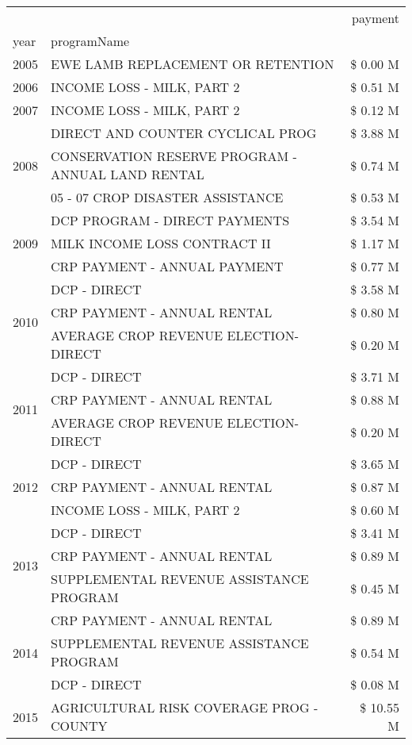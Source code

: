 \begin{tabular}{llr}
\toprule
 &  & payment \\
year & programName &  \\
\midrule
2005 & EWE LAMB REPLACEMENT OR RETENTION & \$ 0.00 M \\
\cline{1-3}
2006 & INCOME LOSS - MILK, PART 2 & \$ 0.51 M \\
\cline{1-3}
2007 & INCOME LOSS - MILK, PART 2 & \$ 0.12 M \\
\cline{1-3}
\multirow[t]{3}{*}{2008} & DIRECT AND COUNTER CYCLICAL PROG & \$ 3.88 M \\
 & CONSERVATION RESERVE PROGRAM - ANNUAL LAND RENTAL & \$ 0.74 M \\
 & 05 - 07 CROP DISASTER ASSISTANCE & \$ 0.53 M \\
\cline{1-3}
\multirow[t]{3}{*}{2009} & DCP PROGRAM - DIRECT PAYMENTS & \$ 3.54 M \\
 & MILK INCOME LOSS CONTRACT II & \$ 1.17 M \\
 & CRP PAYMENT - ANNUAL PAYMENT & \$ 0.77 M \\
\cline{1-3}
\multirow[t]{3}{*}{2010} & DCP - DIRECT & \$ 3.58 M \\
 & CRP PAYMENT - ANNUAL RENTAL & \$ 0.80 M \\
 & AVERAGE CROP REVENUE ELECTION-DIRECT & \$ 0.20 M \\
\cline{1-3}
\multirow[t]{3}{*}{2011} & DCP - DIRECT & \$ 3.71 M \\
 & CRP PAYMENT - ANNUAL RENTAL & \$ 0.88 M \\
 & AVERAGE CROP REVENUE ELECTION-DIRECT & \$ 0.20 M \\
\cline{1-3}
\multirow[t]{3}{*}{2012} & DCP - DIRECT & \$ 3.65 M \\
 & CRP PAYMENT - ANNUAL RENTAL & \$ 0.87 M \\
 & INCOME LOSS - MILK, PART 2 & \$ 0.60 M \\
\cline{1-3}
\multirow[t]{3}{*}{2013} & DCP - DIRECT & \$ 3.41 M \\
 & CRP PAYMENT - ANNUAL RENTAL & \$ 0.89 M \\
 & SUPPLEMENTAL REVENUE ASSISTANCE PROGRAM & \$ 0.45 M \\
\cline{1-3}
\multirow[t]{3}{*}{2014} & CRP PAYMENT - ANNUAL RENTAL & \$ 0.89 M \\
 & SUPPLEMENTAL REVENUE ASSISTANCE PROGRAM & \$ 0.54 M \\
 & DCP - DIRECT & \$ 0.08 M \\
\cline{1-3}
\multirow[t]{3}{*}{2015} & AGRICULTURAL RISK COVERAGE PROG - COUNTY & \$ 10.55 M \\

\end{tabular}

